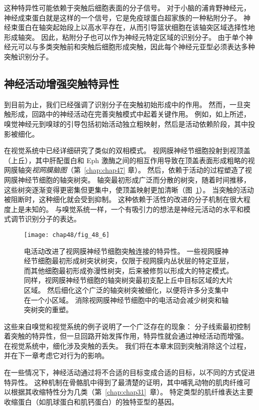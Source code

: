 这种特异性可能依赖于突触后细胞表面的分子信号。
对于小脑的浦肯野神经元，神经成束蛋白就是这样的一个信号，它是免疫球蛋白超家族的一种粘附分子。
神经束蛋白在轴突起始段上以高水平存在，从而引导篮状细胞在该轴突区域选择性地形成轴突。
因此，粘附分子也可以作为神经元特定区域的识别分子。
由于单个神经元可以与多类突触前和突触后细胞形成突触，因此每个神经元亚型必须表达多种突触识别分子。



\subsection{神经活动增强突触特异性}


到目前为止，我们已经强调了识别分子在突触初始形成中的作用。
然而，一旦突触形成，回路中的神经活动在完善突触模式中起着关键作用。
例如，如上所述，嗅觉神经元到嗅球的引导包括初始活动独立粗映射，然后是活动依赖阶段，其中投影被细化。


在视觉系统中已经详细研究了类似的双相模式。
视网膜神经节细胞投射到视顶盖（上丘），其中肝配蛋白和 Eph 激酶之间的相互作用导致在顶盖表面形成粗略的视网膜轴突\textit{视网膜脑图}（第~\ref{chap:chap47} 章）。
然后，依赖于活动的过程塑造了视网膜神经节细胞的轴突树突。
轴突最初形成广泛而分散的树突，随着时间推移，这些树突逐渐变得更密集但更集中，使顶盖映射更加清晰（图~\ref{fig:48_6}）。
当突触的活动被阻断时，这种细化就会受到抑制。
这种依赖于活性的改进的分子机制在很大程度上是未知的。
与嗅觉系统一样，一个有吸引力的想法是神经元活动的水平和模式调节识别分子的表达。


\begin{figure}[htbp]
	\centering
	\texttt{[image: chap48/fig\_48\_6]}
	\caption{电活动改进了视网膜神经节细胞突触连接的特异性。
		一些视网膜神经节细胞最初形成树突状树突，仅限于视网膜内丛状层的特定亚层，而其他细胞最初形成弥漫性树突，后来被修剪以形成大的特定模式。
		同样，视网膜神经节细胞的轴突树突最初支配上丘中目标区域的大片区域。
		然后细化这个广泛的轴突树突被细化，以便将许多分支集中在一个小区域。
		消除视网膜神经节细胞中的电活动会减少树突和轴突树突的重塑。}
	\label{fig:48_6}
\end{figure}


这些来自嗅觉和视觉系统的例子说明了一个广泛存在的现象：
分子线索最初控制着突触的特异性，但一旦回路开始发挥作用，特异性就会通过神经活动而增强。
在视觉系统中，细化涉及突触的丢失。
我们将在本章末回到突触消除这个过程，并在下一章考虑它对行为的影响。


在一些情况下，神经活动通过将不合适的目标变成合适的目标，以不同的方式促进特异性。
这种机制在骨骼肌中得到了最清楚的证明，其中哺乳动物的肌肉纤维可以根据其收缩特性分为几类（第~\ref{chap:chap31}~章）。
特定类型的肌纤维表达主要收缩蛋白（如肌球蛋白和肌钙蛋白）的独特亚型的基因。


